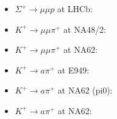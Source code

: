 \documentclass{article}
\begin{document}
\begin{itemize}
\item $\Sigma^+ \to \mu \mu p$ at LHCb: \cite{LHCb:2024fhb,Provenzano:2025cws,LHCb:2025evf}
\item $K^+ \to \mu \mu \pi^+$ at NA48/2: \cite{NA482:2016sfh}
\item $K^+ \to \mu \mu \pi^+$ at NA62: \cite{NA62:2025upx,NA62:2022qes}
\item $K^+ \to a \pi^+$ at E949: \cite{BNL-E949:2009dza}
\item $K^+ \to a \pi^+$ at NA62 (pi0): \cite{NA62:2020pwi}
\item $K^+ \to a \pi^+$ at NA62: \cite{NA62:2025upx}
\end{itemize}


\end{document}
